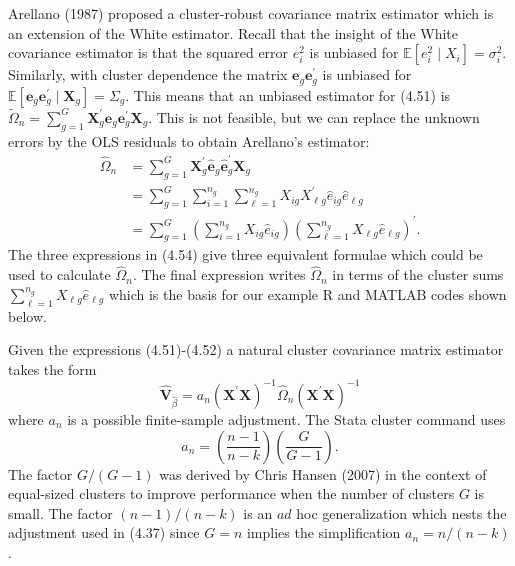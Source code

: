\documentclass[10pt]{article}
\begin{document}
Arellano (1987) proposed a cluster-robust covariance matrix estimator which is an extension of the White estimator. Recall that the insight of the White covariance estimator is that the squared error $e_{i}^{2}$ is unbiased for $\mathbb{E}\left[e_{i}^{2} \mid X_{i}\right]=\sigma_{i}^{2}$. Similarly, with cluster dependence the matrix $\boldsymbol{e}_{g} \boldsymbol{e}_{g}^{\prime}$ is unbiased for $\mathbb{E}\left[\boldsymbol{e}_{g} \boldsymbol{e}_{g}^{\prime} \mid \boldsymbol{X}_{g}\right]=\Sigma_{g}$. This means that an unbiased estimator for (4.51) is $\widetilde{\Omega}_{n}=\sum_{g=1}^{G} \boldsymbol{X}_{g}^{\prime} \boldsymbol{e}_{g} \boldsymbol{e}_{g}^{\prime} \boldsymbol{X}_{g}$. This is not feasible, but we can replace the unknown errors by the OLS residuals to obtain Arellano's estimator:
$$
\begin{aligned}
\widehat{\Omega}_{n} &=\sum_{g=1}^{G} \boldsymbol{X}_{g}^{\prime} \widehat{\boldsymbol{e}}_{g} \widehat{\boldsymbol{e}}_{g}^{\prime} \boldsymbol{X}_{g} \\
&=\sum_{g=1}^{G} \sum_{i=1}^{n_{g}} \sum_{\ell=1}^{n_{g}} X_{i g} X_{\ell g}^{\prime} \widehat{e}_{i g} \widehat{e}_{\ell g} \\
&=\sum_{g=1}^{G}\left(\sum_{i=1}^{n_{g}} X_{i g} \widehat{e}_{i g}\right)\left(\sum_{\ell=1}^{n_{g}} X_{\ell g} \widehat{e}_{\ell g}\right)^{\prime} .
\end{aligned}
$$
The three expressions in (4.54) give three equivalent formulae which could be used to calculate $\widehat{\Omega}_{n}$. The final expression writes $\widehat{\Omega}_{n}$ in terms of the cluster sums $\sum_{\ell=1}^{n_{g}} X_{\ell g} \widehat{e}_{\ell g}$ which is the basis for our example $\mathrm{R}$ and MATLAB codes shown below.

Given the expressions (4.51)-(4.52) a natural cluster covariance matrix estimator takes the form
$$
\widehat{\boldsymbol{V}}_{\widehat{\beta}}=a_{n}\left(\boldsymbol{X}^{\prime} \boldsymbol{X}\right)^{-1} \widehat{\Omega}_{n}\left(\boldsymbol{X}^{\prime} \boldsymbol{X}\right)^{-1}
$$
where $a_{n}$ is a possible finite-sample adjustment. The Stata cluster command uses
$$
a_{n}=\left(\frac{n-1}{n-k}\right)\left(\frac{G}{G-1}\right) .
$$
The factor $G /(G-1)$ was derived by Chris Hansen (2007) in the context of equal-sized clusters to improve performance when the number of clusters $G$ is small. The factor $(n-1) /(n-k)$ is an $a d$ hoc generalization which nests the adjustment used in (4.37) since $G=n$ implies the simplification $a_{n}=n /(n-k)$.
\end{document}
